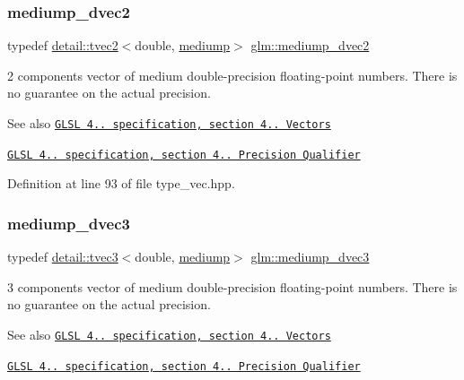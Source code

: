 \subsubsection{\texorpdfstring{mediump\+\_\+dvec2}{mediump\_dvec2}}
{\footnotesize\ttfamily typedef \hyperlink{structglm_1_1detail_1_1tvec2}{detail\+::tvec2}$<$double, \hyperlink{namespaceglm_a0f04f086094c747d227af4425893f545a6416f3ea0c9025fb21ed50c4d6620482}{mediump}$>$ \hyperlink{group__core__precision_gace1f1cc2eb8e978dcb60e682af87b541}{glm\+::mediump\+\_\+dvec2}}

2 components vector of medium double-\/precision floating-\/point numbers. There is no guarantee on the actual precision.

\begin{DoxySeeAlso}{See also}
\href{http://www.opengl.org/registry/doc/GLSLangSpec.4.20.8.pdf}{\tt G\+L\+SL 4.. specification, section 4.. Vectors} 

\href{http://www.opengl.org/registry/doc/GLSLangSpec.4.20.8.pdf}{\tt G\+L\+SL 4.. specification, section 4.. Precision Qualifier} 
\end{DoxySeeAlso}


Definition at line 93 of file type\+\_\+vec.\+hpp.

\mbox{\label{group__core__precision_gac051f0702cb0e717db5dd913f6261388}} 
\subsubsection{\texorpdfstring{mediump\+\_\+dvec3}{mediump\_dvec3}}
{\footnotesize\ttfamily typedef \hyperlink{structglm_1_1detail_1_1tvec3}{detail\+::tvec3}$<$double, \hyperlink{namespaceglm_a0f04f086094c747d227af4425893f545a6416f3ea0c9025fb21ed50c4d6620482}{mediump}$>$ \hyperlink{group__core__precision_gac051f0702cb0e717db5dd913f6261388}{glm\+::mediump\+\_\+dvec3}}

3 components vector of medium double-\/precision floating-\/point numbers. There is no guarantee on the actual precision.

\begin{DoxySeeAlso}{See also}
\href{http://www.opengl.org/registry/doc/GLSLangSpec.4.20.8.pdf}{\tt G\+L\+SL 4.. specification, section 4.. Vectors} 

\href{http://www.opengl.org/registry/doc/GLSLangSpec.4.20.8.pdf}{\tt G\+L\+SL 4.. specification, section 4.. Precision Qualifier} 
\end{DoxySeeAlso}


